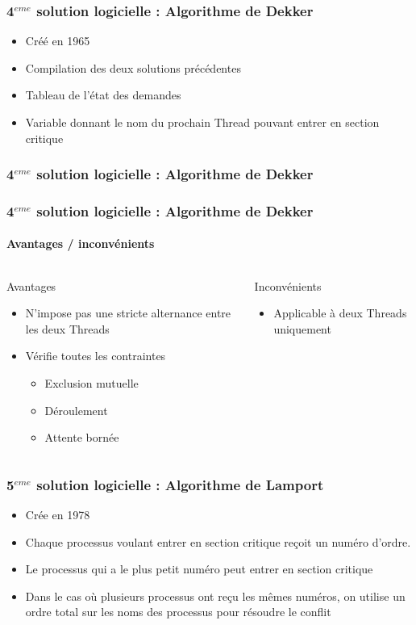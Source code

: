 \begin{frame}
\frametitle{4$^{eme}$ solution logicielle : Algorithme de Dekker}
\begin{itemize}
\item Créé en 1965
\item Compilation des deux solutions précédentes
\item Tableau de l’état des demandes
\item Variable donnant le nom du prochain Thread pouvant entrer en section critique
\end{itemize}
\end{frame}

\begin{frame}
\frametitle{4$^{eme}$ solution logicielle : Algorithme de Dekker}
\begin{scriptsize}\end{scriptsize}
\end{frame}

\begin{frame}
\frametitle{4$^{eme}$ solution logicielle : Algorithme de Dekker}
\framesubtitle{Avantages / inconvénients}

\begin{columns}
\begin{block}{Avantages}
\begin{itemize}
\item N’impose pas une stricte alternance entre les deux Threads
\item Vérifie toutes les contraintes
\begin{itemize}
\item Exclusion mutuelle
\item Déroulement
\item Attente bornée
\end{itemize}
\end{itemize}
\end{block}
\begin{block}{Inconvénients}
\begin{itemize}
\item Applicable à deux Threads uniquement
\end{itemize}
\end{block}
\end{columns}
\end{frame}

\begin{frame}
\frametitle{5$^{eme}$ solution logicielle : Algorithme de Lamport}
\begin{itemize}
\item Crée en 1978
\item Chaque processus voulant entrer en section critique reçoit un numéro d'ordre.
\item Le processus qui a le plus petit numéro peut entrer en section critique
\item Dans le cas où plusieurs processus ont reçu les mêmes numéros, on utilise un ordre total sur les noms des processus pour résoudre le conflit
\end{itemize}
\end{frame}

